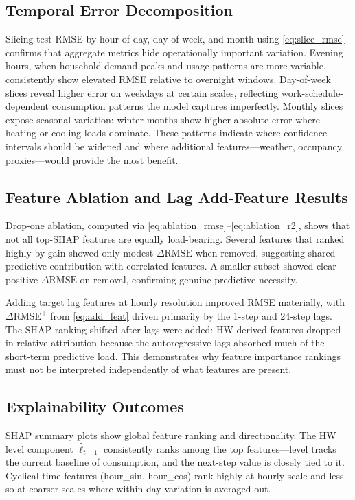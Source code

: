 \documentclass[10pt,twocolumn,letterpaper]{article}
\begin{document}
\subsection{Temporal Error Decomposition}

Slicing test RMSE by hour-of-day, day-of-week, and month using
\eqref{eq:slice_rmse} confirms that aggregate metrics hide
operationally important variation. Evening hours, when household
demand peaks and usage patterns are more variable, consistently show
elevated RMSE relative to overnight windows. Day-of-week slices
reveal higher error on weekdays at certain scales, reflecting
work-schedule-dependent consumption patterns the model captures
imperfectly. Monthly slices expose seasonal variation: winter months
show higher absolute error where heating or cooling loads dominate.
These patterns indicate where confidence intervals should be widened
and where additional features---weather, occupancy proxies---would
provide the most benefit.

\subsection{Feature Ablation and Lag Add-Feature Results}

Drop-one ablation, computed via
\eqref{eq:ablation_rmse}--\eqref{eq:ablation_r2}, shows that not all
top-SHAP features are equally load-bearing. Several features that
ranked highly by gain showed only modest $\Delta\text{RMSE}$ when
removed, suggesting shared predictive contribution with correlated
features. A smaller subset showed clear positive $\Delta\text{RMSE}$
on removal, confirming genuine predictive necessity.

Adding target lag features at hourly
resolution improved RMSE materially, with $\Delta\text{RMSE}^+$ from
\eqref{eq:add_feat} driven primarily by the 1-step and 24-step lags.
The SHAP ranking shifted after lags were added: HW-derived features
dropped in relative attribution because the autoregressive lags
absorbed much of the short-term predictive load. This demonstrates
why feature importance rankings must not be interpreted independently
of what features are present.

\subsection{Explainability Outcomes}

SHAP summary plots show global feature ranking and directionality.
The HW level component $\hat{\ell}_{t-1}$ consistently ranks among
the top features---level tracks the current baseline of consumption,
and the next-step value is closely tied to it. Cyclical time features
(hour\_sin, hour\_cos) rank highly at hourly scale and less so at
coarser scales where within-day variation is averaged out.
\end{document}
